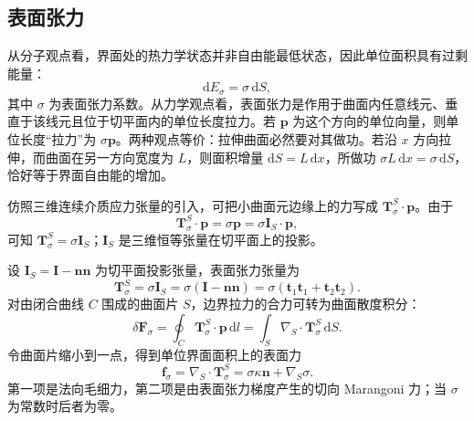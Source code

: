\documentclass[11pt,a4paper,openany,fontset=none]{ctexbook}
\newenvironment{sourceblock}
  {\par\addvspace{0.65\baselineskip}\noindent\begin{minipage}{\linewidth}\centering}
  {\end{minipage}\par\addvspace{0.48\baselineskip}}
\begin{document}
\begin{sourceblock}
\end{sourceblock}

\subsection{表面张力}


从分子观点看，界面处的热力学状态并非自由能最低状态，因此单位面积具有过剩能量：
\begin{equation}
 \mathrm dE_\sigma=\sigma\,\mathrm dS, \tag{2.49}
\end{equation}
其中 $\sigma$ 为表面张力系数。从力学观点看，表面张力是作用于曲面内任意线元、垂直于该线元且位于切平面内的单位长度拉力。若 $\bm p$ 为这个方向的单位向量，则单位长度“拉力”为 $\sigma\bm p$。两种观点等价：拉伸曲面必然要对其做功。若沿 $x$ 方向拉伸，而曲面在另一方向宽度为 $L$，则面积增量 $\mathrm dS=L\,\mathrm dx$，所做功 $\sigma L\,\mathrm dx=\sigma\,\mathrm dS$，恰好等于界面自由能的增加。

仿照三维连续介质应力张量的引入，可把小曲面元边缘上的力写成 $\bm T^S_\sigma\cdot\bm p$。由于
\begin{equation}
 \bm T^S_\sigma\cdot\bm p=\sigma\bm p=\sigma\bm I_S\cdot\bm p, \tag{2.50}
\end{equation}
可知 $\bm T^S_\sigma=\sigma\bm I_S$；$\bm I_S$ 是三维恒等张量在切平面上的投影。

设 $\bm I_S=\bm I-\bm n\bm n$ 为切平面投影张量，表面张力张量为
\begin{equation}
 \bm T_\sigma^S=\sigma\bm I_S=\sigma(\bm I-\bm n\bm n)
 =\sigma(\bm t_1\bm t_1+\bm t_2\bm t_2). \tag{2.51--2.52}
\end{equation}
对由闭合曲线 $C$ 围成的曲面片 $S$，边界拉力的合力可转为曲面散度积分：
\begin{equation}
 \delta\bm F_\sigma=\oint_C\bm T_\sigma^S\cdot\bm p\,\mathrm dl
 =\int_S\nabla_S\cdot\bm T_\sigma^S\,\mathrm dS. \tag{2.53}
\end{equation}
令曲面片缩小到一点，得到单位界面面积上的表面力
\begin{equation}
 \bm f_\sigma=\nabla_S\cdot\bm T_\sigma^S
 =\sigma\kappa\bm n+\nabla_S\sigma. \tag{2.55}
\end{equation}
第一项是法向毛细力，第二项是由表面张力梯度产生的切向 Marangoni 力；当 $\sigma$ 为常数时后者为零。
\end{document}
